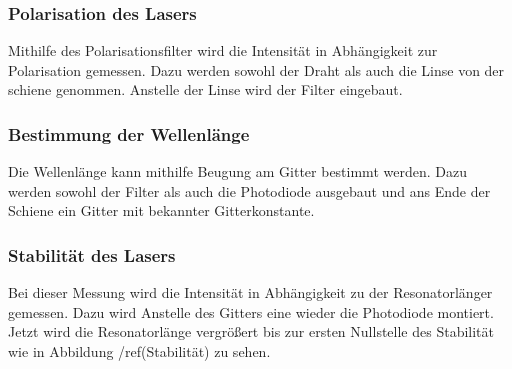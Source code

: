 \subsubsection{Polarisation des Lasers}
Mithilfe des Polarisationsfilter wird die Intensität in Abhängigkeit zur Polarisation gemessen. Dazu werden sowohl der Draht als auch die Linse von der schiene genommen. Anstelle der Linse wird der Filter eingebaut.
\subsubsection{Bestimmung der Wellenlänge}

Die Wellenlänge kann mithilfe Beugung am Gitter bestimmt werden. Dazu werden sowohl der Filter als auch die Photodiode ausgebaut und ans Ende der Schiene ein Gitter mit bekannter Gitterkonstante.\\
\subsubsection{Stabilität des Lasers}
Bei dieser Messung wird die Intensität in Abhängigkeit zu der Resonatorlänger gemessen. Dazu wird Anstelle des Gitters eine wieder die Photodiode montiert. Jetzt wird die Resonatorlänge vergrößert bis zur ersten Nullstelle des Stabilität wie in Abbildung /ref(Stabilität) zu sehen.

